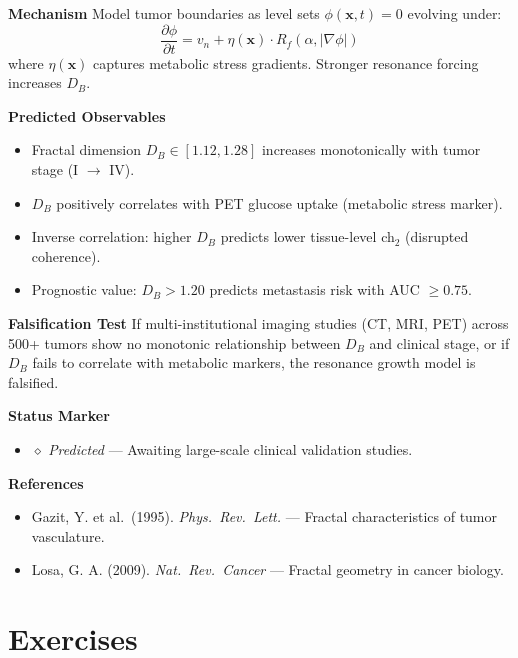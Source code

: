 \textbf{Mechanism}
Model tumor boundaries as level sets $\phi(\mathbf{x},t) = 0$ evolving under:
\[
\frac{\partial \phi}{\partial t} = v_n + \eta(\mathbf{x}) \cdot R_f(\alpha, |\nabla \phi|)
\]
where $\eta(\mathbf{x})$ captures metabolic stress gradients. Stronger resonance forcing increases $D_B$.

\textbf{Predicted Observables}
\begin{itemize}
\item Fractal dimension $D_B \in [1.12, 1.28]$ increases monotonically with tumor stage (I $\to$ IV).
\item $D_B$ positively correlates with PET glucose uptake (metabolic stress marker).
\item Inverse correlation: higher $D_B$ predicts lower tissue-level ch$_2$ (disrupted coherence).
\item Prognostic value: $D_B > 1.20$ predicts metastasis risk with AUC $\geq 0.75$.
\end{itemize}

\textbf{Falsification Test}
If multi-institutional imaging studies (CT, MRI, PET) across 500+ tumors show no monotonic relationship between $D_B$ and clinical stage, or if $D_B$ fails to correlate with metabolic markers, the resonance growth model is falsified.

\textbf{Status Marker}
\begin{itemize}
\item $\diamond$ \textit{Predicted} — Awaiting large-scale clinical validation studies.
\end{itemize}

\textbf{References}
\begin{itemize}
\item Gazit, Y. et al.\ (1995). \textit{Phys.\ Rev.\ Lett.} — Fractal characteristics of tumor vasculature\cite{gazit1995}.
\item Losa, G. A. (2009). \textit{Nat.\ Rev.\ Cancer} — Fractal geometry in cancer biology\cite{losa2009}.
\end{itemize}

\section*{Exercises}

